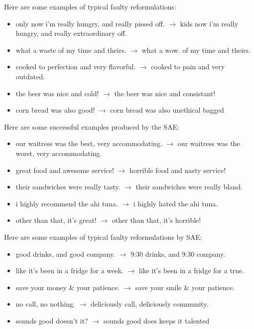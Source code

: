 \documentclass[11pt,a4paper]{article}
\begin{document}
Here are some examples of typical faulty reformulations:
\begin{itemize}
\item only now i'm really hungry, and really pissed off. $\rightarrow$  kids now i'm really hungry, and really extraordinary off.
\item what a waste of my time and theirs. $\rightarrow$ what a wow. of my time and theirs.
\item cooked to perfection and very flavorful. $\rightarrow$ cooked to pain and very outdated.
\item the beer was nice and cold! $\rightarrow$ the beer was nice and consistant!
\item corn bread was also good! $\rightarrow$ corn bread was also unethical bagged
\end{itemize}

Here are some successful examples produced by the SAE:
\begin{itemize}
\item our waitress was the best, very accommodating. $\rightarrow$ our waitress was the worst, very accommodating.
\item great food and awesome service! $\rightarrow$ horrible food and nasty service!
\item their sandwiches were really tasty. $\rightarrow$ their sandwiches were really bland.
\item i highly recommend the ahi tuna. $\rightarrow$ i highly hated the ahi tuna.
\item other than that, it's great! $\rightarrow$ other than that, it's horrible!
\end{itemize}

Here are some examples of typical faulty reformulations by SAE:
\begin{itemize}
\item good drinks, and good company. $\rightarrow$ 9:30 drinks, and 9:30 company.
\item like it's been in a fridge for a week. $\rightarrow$ like it's been in a fridge for a true.
\item save your money \& your patience. $\rightarrow$ save your smile \& your patience.
\item no call, no nothing. $\rightarrow$ deliciously call, deliciously community.
\item sounds good doesn't it? $\rightarrow$ sounds good does keeps it talented
\end{itemize}
\end{document}
